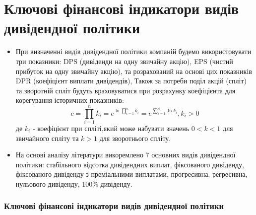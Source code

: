 \documentclass[aspectratio=169]{beamer}
\begin{document}
\section{Ключові фінансові індикатори видів дивідендної політики}
\begin{frame}
\begin{itemize}
\item При визначенні видів дивідендної політики компаній будемо використовувати три показники: \alert {DPS} (дивіденди на одну звичайну акцію), \alert {EPS} (чистий прибуток на одну звичайну акцію), та розрахований на основі цих показників \alert {DPR} (коефіцієнт виплати дивідендів), Також за потреби поділ акцій (спліт) та зворотній спліт будуть враховуватися при розрахунку \alert {коефіцієнта для корегування історичних показників}:
\[c=\prod_{i=1}^{n}k_{i}=e^{\ln\prod_{i=1}^{n}k_{i}}=e^{\sum_{i=1}^{n}\ln k_{i}}, k_{i}>0\]
де $k_{i}$ - коефіцієнт при спліті,який може набувати значень $0<k<1$  для звичайного спліту та $k>1$ для зворотнього спліту.
\smallskip
\item На основі аналізу літератури викоремлено 7 основних \alert {видів
дивідендної політики}: стабільного відсотка дивідендних виплат, фіксованого дивіденду, фіксованого дивіденду з преміальними виплатами, прогресивна, регресивна, нульового дивіденду, 100\% дивіденду.
\end{itemize}
\frametitle{Ключові фінансові індикатори видів дивідендної політики}
\end{frame}
\end{document}
